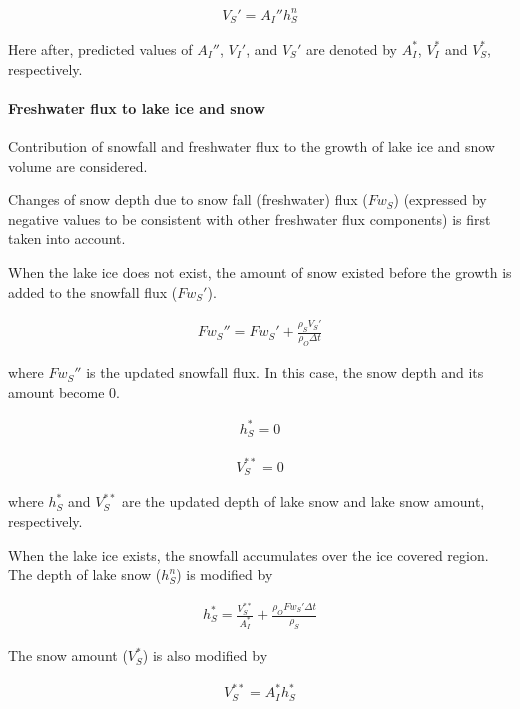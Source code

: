 \begin{eqnarray}
    V_S' = A_I'' h_S^n
\end{eqnarray}

Here after, predicted values of \(A_I''\), \(V_I'\), and \(V_S'\) are denoted by \(A_I^\ast\), \(V_I^\ast\) and \(V_S^{\ast}\), respectively.

\hypertarget{freshwater-flux-to-lake-ice-and-snow}{%
\paragraph{Freshwater flux to lake ice and snow}\label{freshwater-flux-to-lake-ice-and-snow}}

Contribution of snowfall and freshwater flux to the growth of lake ice and snow volume are considered.

Changes of snow depth due to snow fall (freshwater) flux (\(Fw_S\)) (expressed by negative values to be consistent with other freshwater flux components) is first taken into account.

When the lake ice does not exist, the amount of snow existed before the growth is added to the snowfall flux (\(Fw_S'\)).

\begin{eqnarray}
    Fw_S'' = Fw_S' + \frac{\rho_S V_S'}{\rho_O \Delta t}
\end{eqnarray}

where \(Fw_S''\) is the updated snowfall flux. In this case, the snow depth and its amount become 0.

\begin{eqnarray}
h_S^\ast=0
\end{eqnarray}

\begin{eqnarray}
V_S^{\ast\ast} = 0
\end{eqnarray}

where \(h_S^\ast\) and \(V_S^{\ast\ast}\) are the updated depth of lake snow and lake snow amount, respectively.

When the lake ice exists, the snowfall accumulates over the ice covered region. The depth of lake snow (\(h_S^n\)) is modified by

\begin{eqnarray}
    h_S^\ast = \frac{V_S^{\ast\ast}}{A_I^\ast} + \frac{\rho_O Fw_S'\Delta t}{\rho_S}
\end{eqnarray}

The snow amount (\(V_S^\ast\)) is also modified by

\begin{eqnarray}
    V_S^{\ast\ast} = A_I^\ast h_S^\ast
\end{eqnarray}

